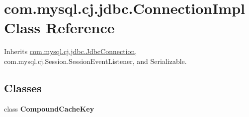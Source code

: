 \hypertarget{classcom_1_1mysql_1_1cj_1_1jdbc_1_1_connection_impl}{}\section{com.\+mysql.\+cj.\+jdbc.\+Connection\+Impl Class Reference}
\label{classcom_1_1mysql_1_1cj_1_1jdbc_1_1_connection_impl}


Inherits \mbox{\hyperlink{interfacecom_1_1mysql_1_1cj_1_1jdbc_1_1_jdbc_connection}{com.\+mysql.\+cj.\+jdbc.\+Jdbc\+Connection}}, com.\+mysql.\+cj.\+Session.\+Session\+Event\+Listener, and Serializable.

\subsection*{Classes}
\begin{DoxyCompactItemize}
\item 
class {\bfseries Compound\+Cache\+Key}
\end{DoxyCompactItemize}
